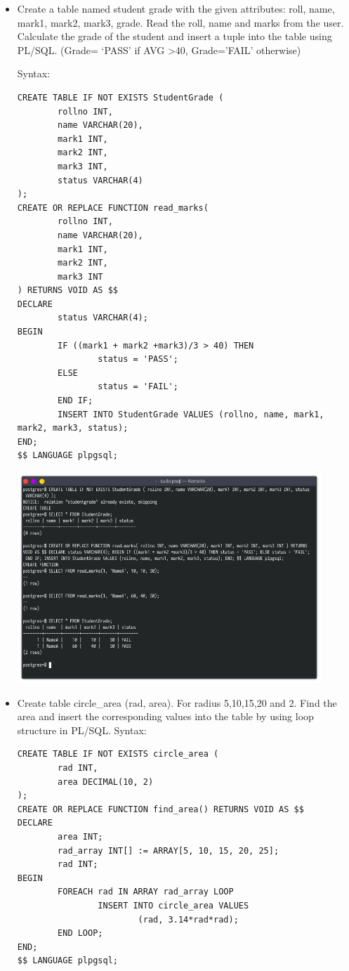 \documentclass[13pt,oneside]{book}
\begin{document}
\begin{itemize}
\item
Create a table named student grade with the given attributes:
 roll, name, mark1, mark2, mark3, grade. Read the roll, name and marks from the user.
 Calculate the grade of the student and insert a tuple into the table using PL/SQL.
 (Grade= `PASS' if AVG >40, Grade='FAIL' otherwise)
 
 
Syntax:
\begin{verbatim}
CREATE TABLE IF NOT EXISTS StudentGrade (
        rollno INT,
        name VARCHAR(20),
        mark1 INT,
        mark2 INT,
        mark3 INT,
        status VARCHAR(4)
);
CREATE OR REPLACE FUNCTION read_marks(
        rollno INT,
        name VARCHAR(20),
        mark1 INT,
        mark2 INT,
        mark3 INT
) RETURNS VOID AS $$
DECLARE
        status VARCHAR(4);
BEGIN
        IF ((mark1 + mark2 +mark3)/3 > 40) THEN
                status = 'PASS';
        ELSE 
                status = 'FAIL';
        END IF;
        INSERT INTO StudentGrade VALUES (rollno, name, mark1, mark2, mark3, status);
END;
$$ LANGUAGE plpgsql;

\end{verbatim}
\includegraphics[width=0.9\textwidth]{img/p8/ss3.png}


\item
Create table circle\_area (rad, area). For radius 5,10,15,20 and 2. Find the area and
insert the corresponding values into the table by using loop structure in PL/SQL.
Syntax:
\begin{verbatim}
CREATE TABLE IF NOT EXISTS circle_area (
        rad INT,
        area DECIMAL(10, 2)
);
CREATE OR REPLACE FUNCTION find_area() RETURNS VOID AS $$
DECLARE
        area INT;
        rad_array INT[] := ARRAY[5, 10, 15, 20, 25];
        rad INT;
BEGIN
        FOREACH rad IN ARRAY rad_array LOOP
                INSERT INTO circle_area VALUES 
                        (rad, 3.14*rad*rad);
        END LOOP;
END;
$$ LANGUAGE plpgsql;


\end{verbatim}
\end{itemize}
\end{document}
